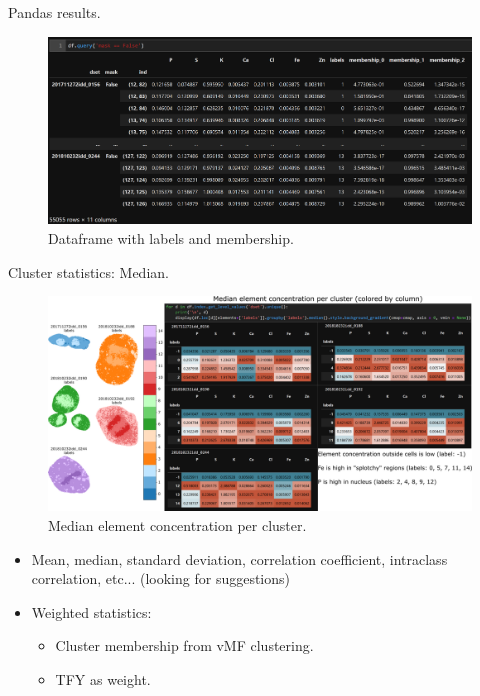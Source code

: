 \documentclass[
]{beamer}
\begin{document}
\begin{frame}{Pandas results.}
\begin{figure}
    \includegraphics[width=1\textwidth,height=.7\textheight,keepaspectratio]{dataframe_labeled.PNG}
    \caption{Dataframe with labels and membership.}
\end{figure}
\end{frame}

\begin{frame}{Cluster statistics: Median.}
\begin{figure}[h]
  \includegraphics[width=1\textwidth,height=.5\textheight,keepaspectratio]{Cluster_median.png}
  \caption{Median element concentration per cluster.}
\end{figure}
\begin{itemize}
\item Mean, median, standard deviation, correlation coefficient, intraclass correlation, etc... (looking for suggestions)
\item Weighted statistics:
\begin{itemize}
	\item Cluster membership from vMF clustering.
    \item TFY as weight.
\end{itemize}
\end{itemize}
\end{frame}
\end{document}
